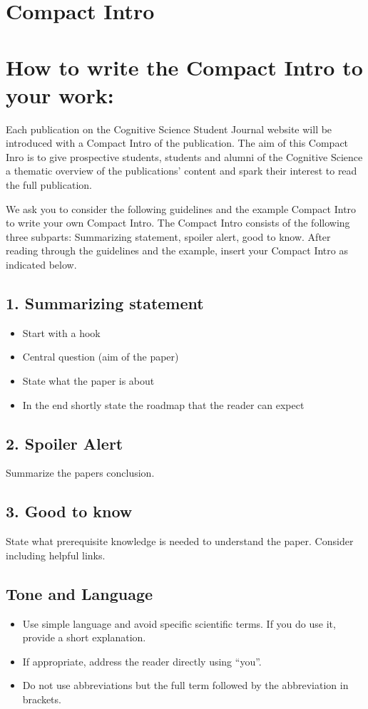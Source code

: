 \section{Compact Intro}
\section*{How to write the Compact Intro to your work:}
Each publication on the Cognitive Science Student Journal website will be introduced with a Compact Intro of the publication. The aim of this Compact Inro is to give prospective students, students and alumni of the Cognitive Science a thematic overview of the publications' content and spark their interest to read the full publication.

We ask you to consider the following guidelines and the example Compact Intro to write your own Compact Intro.
The Compact Intro consists of the following three subparts: Summarizing statement, spoiler alert, good to know.
After reading through the guidelines and the example, insert your Compact Intro as indicated below.

\subsection*{1. Summarizing statement}
\begin{itemize}
    \item Start with a hook
    \item Central question (aim of the paper)
    \item State what the paper is about
    \item In the end shortly state the roadmap that the reader can expect
\end{itemize}

\subsection*{2. Spoiler Alert} 
Summarize the papers conclusion.

\subsection*{3. Good to know} 
State what prerequisite knowledge is needed to understand the paper. Consider including helpful links.

\subsection*{Tone and Language}
\begin{itemize}
    \item Use simple language and avoid specific scientific terms. If you do use it, provide a short explanation.
    \item If appropriate, address the reader directly using ``you”.
    \item Do not use abbreviations but the full term followed by the abbreviation in brackets.
\end{itemize}


